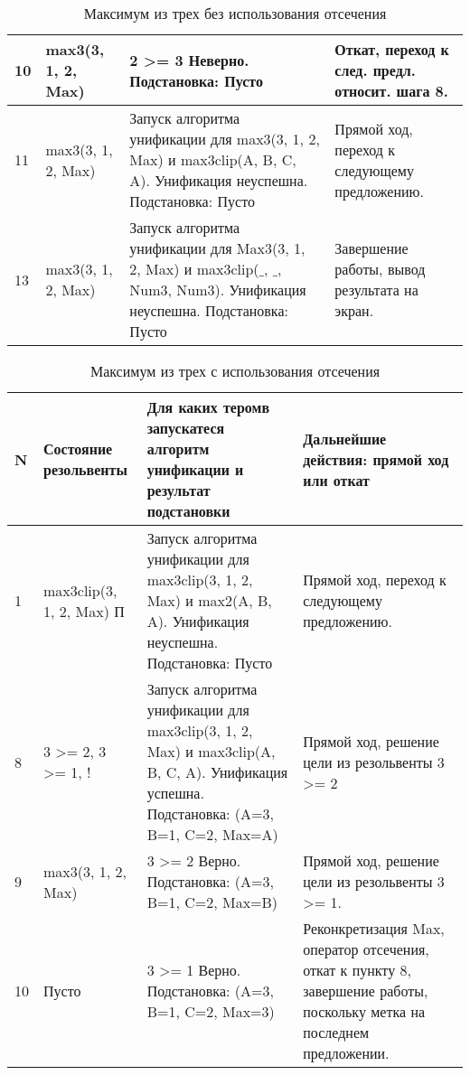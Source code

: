 \begin{table}[ht!]
	\centering
	\caption{Максимум из трех без использования отсечения}
	\label{decisions}
	\begin{tabular}{|p{0.3cm}|p{4cm}|p{7.5cm}|p{4cm}|}

			\hline
			10 & max3(3, 1, 2, Max)
			& 2 >= 3 Неверно. Подстановка: Пусто
			& Откат, переход к след. предл. относит. шага 8.\\
		
			\hline

			11 & max3(3, 1, 2, Max)
			& Запуск алгоритма унификации для max3(3, 1, 2, Max) и
			max3clip(A, B, C, A).
			Унификация неуспешна. Подстановка: Пусто
			& Прямой ход, переход к следующему предложению.\\
		
			\hline

			13 & max3(3, 1, 2, Max)
			& Запуск алгоритма унификации для Max3(3, 1, 2, Max) 
			и max3clip($\_$, $\_$, Num3, Num3). Унификация неуспешна. Подстановка: Пусто
			& Завершение работы, вывод результата на экран.\\
		
			\hline
	\end{tabular}
\end{table}


\begin{table}[ht!]
	\centering
	\caption{Максимум из трех с использования отсечения}
	\label{decisions}
	\begin{tabular}{|p{0.3cm}|p{4cm}|p{7.5cm}|p{4cm}|}
			\hline
			\textbf{N} & \textbf{Состояние резольвенты} & \textbf{Для каких теромв запускатеся алгоритм унификации и результат подстановки} & \textbf{Дальнейшие действия: прямой ход или откат}\\
			\hline
			1 & max3clip(3, 1, 2, Max) П 
			&  Запуск алгоритма унификации 
			для max3clip(3, 1, 2, Max) и
			max2(A, B, A).
			Унификация неуспешна.
			Подстановка: Пусто 
			& Прямой ход, переход к следующему предложению. \\
			\hline

			8 & 3 >= 2, 3 >= 1, !
			& Запуск алгоритма унификации для
			max3clip(3, 1, 2, Max) и
			max3clip(A, B, C, A).
			Унификация успешна. Подстановка: (A=3, B=1, C=2, Max=A)
			& Прямой ход, решение цели из
			резольвенты 3 >= 2\\
		
			\hline

			9 & max3(3, 1, 2, Max)
			& 3 >= 2 Верно. Подстановка: (A=3, B=1, C=2, Max=B)
			& Прямой ход, решение цели из
			резольвенты 3 >= 1. \\
		
			\hline

			10 & Пусто
			& 3 >= 1 Верно. Подстановка: (A=3, B=1, C=2, Max=3)
			& Реконкретизация Max, оператор
			отсечения, откат к пункту 8, завершение работы, поскольку
			метка на последнем предложении.\\
		
			\hline
	\end{tabular}
\end{table}